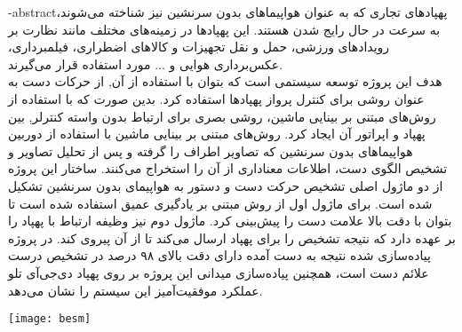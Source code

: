 \department{}
\secondsupervisor{}


\fa-abstract{پهپادهای تجاری که به عنوان هواپیما‌های بدون سرنشین 
نیز شناخته می‌شوند، به سرعت در حال رایج شدن هستند. این پهپاد‌ها در زمینه‌های مختلف مانند نظارت بر رویدادهای ورزشی، حمل و نقل تجهیزات
 و کالاهای اضطراری، فیلمبرداری، عکس‌برداری هوایی و ... مورد استفاده قرار می‌گیرند.
  \\
هدف این پروژه توسعه سیستمی است که بتوان با استفاده از آن, از حرکات دست به عنوان روشی برای کنترل پرواز پهپاد‌ها استفاده کرد.
بدین صورت که با استفاده از روش‌های مبتنی بر بینایی ماشین، روشی بصری برای ارتباط بدون واسته کنترلر, بین پهپاد و اپراتور آن ایجاد کرد.
 روش‌های مبتنی بر بینایی ماشین با استفاده از دوربین هواپیما‌های بدون سرنشین که تصاویر اطراف را گرفته و پس
 از تحلیل تصاویر و تشخیص الگوی دست، اطلاعات معناداری از آن را استخراج می‌کنند. ساختار این پروژه از دو ماژول
 اصلی تشخیص حرکت دست
 و دستور به هواپیمای بدون سرنشین تشکیل شده است. برای ماژول اول از روش مبتنی بر
 یادگیری عمیق
 استفاده شده است تا بتوان با دقت بالا علامت دست را پیش‌بینی کرد. ماژول دوم نیز وظیفه ارتباط با پهپاد را بر عهده دارد که نتیجه تشخیص را برای پهپاد ارسال می‌کند تا از آن پیروی کند.
 در پروژه پیاده‌سازی شده نتیجه به دست آمده دارای دقت بالای ۹۸ درصد در تشخیص درست علائم دست است، همچنین پیاده‌سازی میدانی این پروژه بر روی پهپاد دی‌جی‌آی تلو عملکرد موفقیت‌آمیز این سیستم را نشان می‌دهد.
 }



\vspace*{7cm}
\thispagestyle{empty}
\begin{center}
\texttt{[image: besm]}
\end{center}